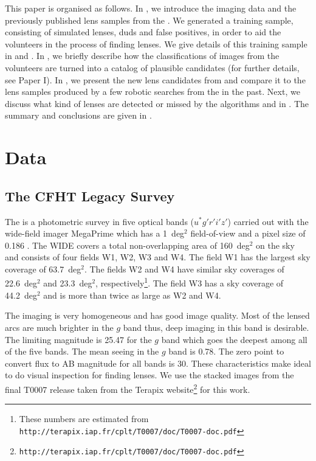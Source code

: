 \documentclass[useAMS,usenatbib,a4paper]{mn2e}
\begin{document}
This paper is organised as follows. In
, we introduce the \cfhtls imaging data and the
previously published lens samples from the \cfhtls. We generated a training sample,
consisting of simulated lenses, duds and false positives, in order to
aid the \sw volunteers in the process of finding lenses. We give details of this
training sample in  and . In ,
we briefly describe how the classifications of images from the volunteers are
turned into a catalog of plausible candidates (for further details, see
Paper I). In , we present the new lens candidates from \sw and
compare it to the lens samples produced by a few robotic searches from
the \cfhtls in the past. Next, we discuss what kind of lenses are detected
or missed by the algorithms and \sw in . The summary
and conclusions are given in .



\section{Data}
\label{sec:data}
\subsection{The CFHT Legacy Survey}
\label{sec:data:cfhtls}

The \cfhtls is a photometric survey in five optical bands
($u^*g'r'i'z'$) carried out with the wide-field imager MegaPrime which
has a 1~deg$^2$ field-of-view and a pixel size of 0.186\arcsec
\citep{Gwyn2012}. The \cfhtls WIDE covers a total
non-overlapping area of 160~deg$^2$ on the sky and consists of four
fields W1, W2, W3 and W4. The field W1 has the largest sky coverage of
63.7~deg$^2$. The fields W2 and W4 have similar sky coverages of
22.6~deg$^2$ and 23.3~deg$^2$, respectively\footnote{These numbers are
estimated from
\texttt{http://terapix.iap.fr/cplt/T0007/doc/T0007-doc.pdf}}.  The field
W3 has a sky coverage of 44.2~deg$^2$ and is more than twice as large as
W2 and W4.

The \cfhtls imaging is very homogeneous and has good image quality. Most
of the lensed arcs are much brighter in the $g$ band thus, deep imaging
in this band is desirable. The limiting magnitude is 25.47 for the $g$
band which goes the deepest among all of the five bands. The mean seeing
in the $g$ band is 0.78\arcsec. The zero point to convert flux to AB
magnitude for all bands is 30. These characteristics make \cfhtls ideal
to do visual inspection for finding lenses.  We use the stacked images
from the final T0007 release taken from the Terapix
website\footnote{\texttt{http://terapix.iap.fr/cplt/T0007/doc/T0007-doc.pdf}} for this
work.
\end{document}
